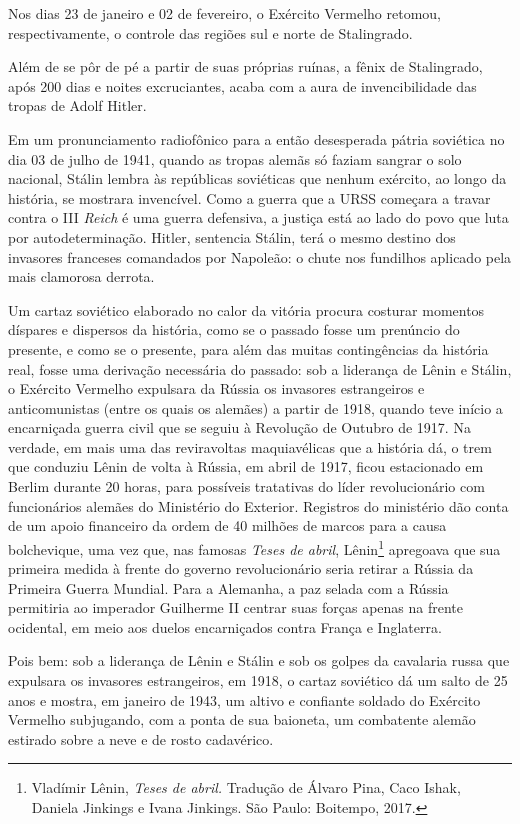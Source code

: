 Nos dias 23 de janeiro e 02 de fevereiro, o Exército Vermelho retomou,
respectivamente, o controle das regiões sul e norte de Stalingrado.

Além de se pôr de pé a partir de suas próprias ruínas, a fênix de
Stalingrado, após 200 dias e noites excruciantes, acaba com a aura de
invencibilidade das tropas de Adolf Hitler.

Em um pronunciamento radiofônico para a então desesperada pátria
soviética no dia 03 de julho de 1941, quando as tropas alemãs só faziam
sangrar o solo nacional, Stálin lembra às repúblicas soviéticas que
nenhum exército, ao longo da história, se mostrara invencível. Como a
guerra que a URSS começara a travar contra o III \emph{Reich} é uma
guerra defensiva, a justiça está ao lado do povo que luta por
autodeterminação. Hitler, sentencia Stálin, terá o mesmo destino dos
invasores franceses comandados por Napoleão: o chute nos fundilhos
aplicado pela mais clamorosa derrota.

Um cartaz soviético elaborado no calor da vitória procura costurar
momentos díspares e dispersos da história, como se o passado fosse um
prenúncio do presente, e como se o presente, para além das muitas
contingências da história real, fosse uma derivação necessária do
passado: sob a liderança de Lênin e Stálin, o Exército Vermelho
expulsara da Rússia os invasores estrangeiros e anticomunistas (entre os
quais os alemães) a partir de 1918, quando teve início a encarniçada
guerra civil que se seguiu à Revolução de Outubro de 1917. Na verdade,
em mais uma das reviravoltas maquiavélicas que a história dá, o trem que
conduziu Lênin de volta à Rússia, em abril de 1917, ficou estacionado em
Berlim durante 20 horas, para possíveis tratativas do líder
revolucionário com funcionários alemães do Ministério do Exterior.
Registros do ministério dão conta de um apoio financeiro da ordem de 40
milhões de marcos para a causa bolchevique, uma vez que, nas famosas
\emph{Teses de abril}, Lênin\footnote{Vladímir Lênin, \emph{Teses de
  abril.} Tradução de Álvaro Pina, Caco Ishak, Daniela Jinkings e Ivana
  Jinkings. São Paulo: Boitempo, 2017.} apregoava que sua primeira
medida à frente do governo revolucionário seria retirar a Rússia da
Primeira Guerra Mundial. Para a Alemanha, a paz selada com a Rússia
permitiria ao imperador Guilherme II centrar suas forças apenas na
frente ocidental, em meio aos duelos encarniçados contra França e
Inglaterra.

Pois bem: sob a liderança de Lênin e Stálin e sob os golpes da cavalaria
russa que expulsara os invasores estrangeiros, em 1918, o cartaz
soviético dá um salto de 25 anos e mostra, em janeiro de 1943, um altivo
e confiante soldado do Exército Vermelho subjugando, com a ponta de sua
baioneta, um combatente alemão estirado sobre a neve e de rosto
cadavérico.

